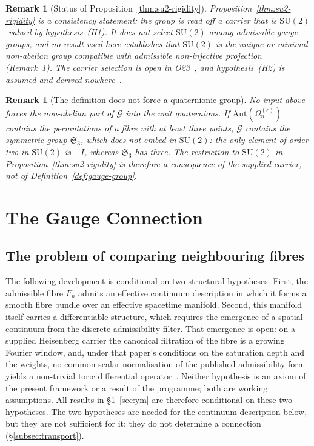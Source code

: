 \documentclass[11pt,a4paper]{article}
\newtheorem{remark}[theorem]{Remark}
\begin{document}
    \begin{remark}[Status of Proposition~\ref{thm:su2-rigidity}]
      Proposition~\ref{thm:su2-rigidity} is a consistency statement: the group is read off a
      carrier that is $\mathrm{SU}(2)$-valued by hypothesis~(H1).
      It does not select $\mathrm{SU}(2)$ among admissible gauge groups, and no result used here
      establishes that $\mathrm{SU}(2)$ is the unique or minimal non-abelian group compatible
      with admissible non-injective projection
      (Remark~\ref{rem:no-quaternionic-forcing}).
      The carrier selection is open in O23~\cite{Beau2026a27}, and hypothesis~(H2) is assumed
      and derived nowhere~\cite{Beau2026a31}.
    \end{remark}

    \begin{remark}[The definition does not force a quaternionic group]
      \label{rem:no-quaternionic-forcing}
      No input above forces the non-abelian part of $\mathcal{G}$ into the unit quaternions.
      If $\mathrm{Aut}(\Omega_n^{(c)})$ contains the permutations of a fibre with at least three
      points, $\mathcal{G}$ contains the symmetric group $\mathfrak{S}_3$, which does not embed
      in $\mathrm{SU}(2)$: the only element of order two in $\mathrm{SU}(2)$ is $-I$, whereas
      $\mathfrak{S}_3$ has three.
      The restriction to $\mathrm{SU}(2)$ in Proposition~\ref{thm:su2-rigidity} is therefore a
      consequence of the supplied carrier, not of Definition~\ref{def:gauge-group}.
    \end{remark}

  \section{The Gauge Connection}
  \label{sec:connection}

  \subsection{The problem of comparing neighbouring fibres}

    The following development is conditional on two structural hypotheses.
    First, the admissible fibre $F_n$ admits an effective continuum description
    in which it forms a smooth fibre bundle over an effective spacetime manifold.
    Second, this manifold itself carries a differentiable structure, which requires
    the emergence of a spatial continuum from the discrete admissibility filter.
    That emergence is open: on a supplied Heisenberg carrier the canonical filtration of the
    fibre is a growing Fourier window, and, under that paper's conditions on the saturation depth and
    the weights, no common scalar normalisation of the published admissibility form yields a
    non-trivial toric differential operator~\cite{Beau2026q5a}.
    Neither hypothesis is an axiom of the present framework or a result of the programme;
    both are working assumptions.
    All results in §\ref{sec:connection}--\ref{sec:ym} are therefore conditional
    on these two hypotheses.
    The two hypotheses are needed for the continuum description below, but they are not sufficient
    for it: they do not determine a connection (§\ref{subsec:transport}).
\end{document}
